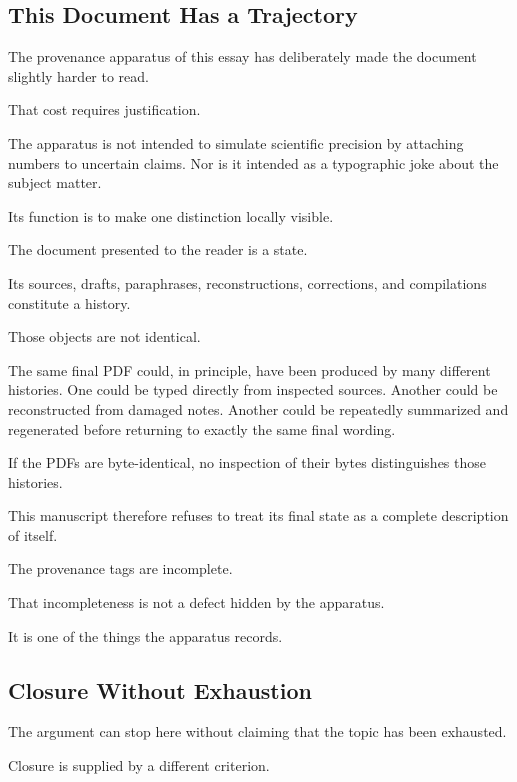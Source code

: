 \documentclass[
  11pt,
  a4paper,
  DIV=12,
  BCOR=0mm,
  parskip=half-
]{scrartcl}
\theoremstyle{definition}
\theoremstyle{plain}
\theoremstyle{remark}
\begin{document}
\subsection{This Document Has a Trajectory}
\label{sec:document-trajectory}

The provenance apparatus of this essay has deliberately made the document
slightly harder to read.

That cost requires justification.

The apparatus is not intended to simulate scientific precision by attaching
numbers to uncertain claims. Nor is it intended as a typographic joke about
the subject matter.

Its function is to make one distinction locally visible.

The document presented to the reader is a state.

Its sources, drafts, paraphrases, reconstructions, corrections, and
compilations constitute a history.

Those objects are not identical.

The same final PDF could, in principle, have been produced by many different
histories. One could be typed directly from inspected sources. Another could
be reconstructed from damaged notes. Another could be repeatedly summarized
and regenerated before returning to exactly the same final wording.

If the PDFs are byte-identical, no inspection of their bytes distinguishes
those histories.

This manuscript therefore refuses to treat its final state as a complete
description of itself.

The provenance tags are incomplete.

That incompleteness is not a defect hidden by the apparatus.

It is one of the things the apparatus records.


\subsection{Closure Without Exhaustion}
\label{sec:closure}

The argument can stop here without claiming that the topic has been exhausted.

Closure is supplied by a different criterion.
\end{document}
